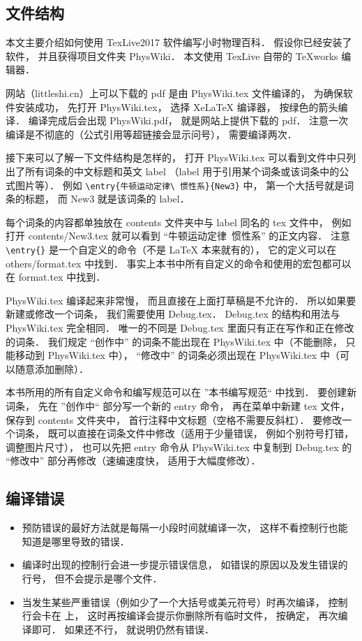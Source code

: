 
\subsection{文件结构}

本文主要介绍如何使用 TexLive2017 软件编写小时物理百科． 假设你已经安装了软件， 并且获得项目文件夹 PhysWiki． 本文使用 TexLive 自带的 TeXworks 编辑器．

网站（littleshi.cn）上可以下载的 pdf 是由 PhysWiki.tex 文件编译的， 为确保软件安装成功， 先打开 PhysWiki.tex， 选择 XeLaTeX 编译器， 按绿色的箭头编译． 编译完成后会出现 PhysWiki.pdf， 就是网站上提供下载的 pdf． 注意一次编译是不彻底的（公式引用等超链接会显示问号）， 需要编译两次．

接下来可以了解一下文件结构是怎样的， 打开 PhysWiki.tex 可以看到文件中只列出了所有词条的中文标题和英文 label （label 用于引用某个词条或该词条中的公式图片等）． 例如 \lstinline|\entry{牛顿运动定律\ 惯性系}{New3}| 中， 第一个大括号就是词条的标题， 而 New3 就是该词条的 label．

每个词条的内容都单独放在 contents 文件夹中与 label 同名的 tex 文件中， 例如打开 contents/New3.tex 就可以看到 “牛顿运动定律\ 惯性系” 的正文内容． 注意 \lstinline|\entry{}| 是一个自定义的命令（不是 LaTeX 本来就有的）， 它的定义可以在 others/format.tex 中找到． 事实上本书中所有自定义的命令和使用的宏包都可以在 format.tex 中找到．

PhysWiki.tex 编译起来非常慢， 而且直接在上面打草稿是不允许的． 所以如果要新建或修改一个词条， 我们需要使用 Debug.tex． Debug.tex 的结构和用法与 PhysWiki.tex 完全相同． 唯一的不同是 Debug.tex 里面只有正在写作和正在修改的词条． 我们规定 “创作中” 的词条不能出现在 PhysWiki.tex 中（不能删除， 只能移动到 PhysWiki.tex 中）， “修改中” 的词条必须出现在 PhysWiki.tex 中（可以随意添加删除）．

本书所用的所有自定义命令和编写规范可以在 ”本书编写规范“ 中找到． 要创建新词条， 先在 ”创作中“ 部分写一个新的 entry 命令， 再在菜单中新建 tex 文件， 保存到 contents 文件夹中， 首行注释中文标题（空格不需要反斜杠）． 要修改一个词条， 既可以直接在词条文件中修改（适用于少量错误， 例如个别符号打错， 调整图片尺寸）， 也可以先把 entry 命令从 PhysWiki.tex 中复制到 Debug.tex 的 “修改中” 部分再修改（速编速度快， 适用于大幅度修改）．

\subsection{编译错误}

\begin{itemize}
\item 预防错误的最好方法就是每隔一小段时间就编译一次， 这样不看控制行也能知道是哪里导致的错误．
\item 编译时出现的控制行会进一步提示错误信息， 如错误的原因以及发生错误的行号， 但不会提示是哪个文件．
\item 当发生某些严重错误（例如少了一个大括号或美元符号）时再次编译， 控制行会卡在 \lstinline|| 上， 这时再按编译会提示你删除所有临时文件， 按确定， 再次编译即可． 如果还不行， 就说明仍然有错误．
\end{itemize}
